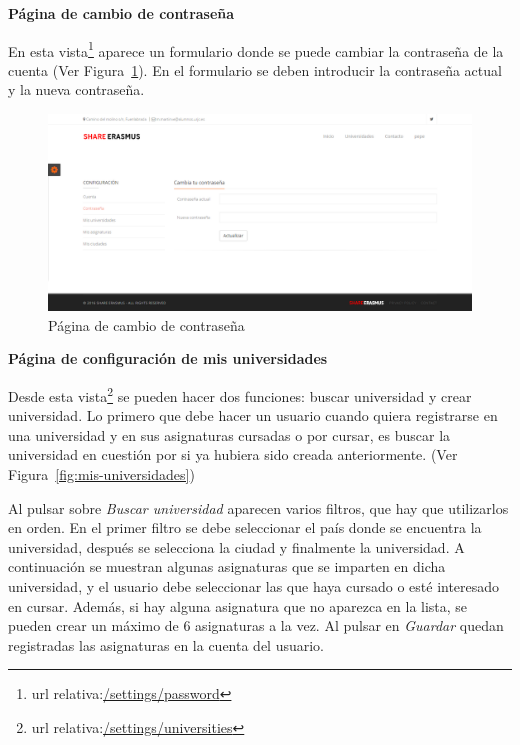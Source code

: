 \documentclass[a4paper, 12pt]{book}
\begin{document}
{\large  \textbf{Página de cambio de contraseña}\par}

En esta vista\footnote{url relativa:\url{/settings/password}} aparece un formulario donde se puede cambiar la contraseña de la cuenta (Ver Figura~\ref{fig:contrasena}). En el formulario se deben introducir la contraseña actual y la nueva contraseña.
\newline

\begin{figure}[H]
  \centering
  \includegraphics[width=16cm, keepaspectratio]{img/contrasena.png}
  \caption{Página de cambio de contraseña}
  \label{fig:contrasena}
\end{figure}

{\large  \textbf{Página de configuración de mis universidades}\par}

Desde esta vista\footnote{url relativa:\url{/settings/universities}} se pueden hacer dos funciones: buscar universidad y crear universidad. Lo primero que debe hacer un usuario cuando quiera registrarse en una universidad y en sus asignaturas cursadas o por cursar, es buscar la universidad en cuestión por si ya hubiera sido creada anteriormente.  (Ver Figura~\ref{fig:mis-universidades})
\newline

Al pulsar sobre \textit{Buscar universidad} aparecen varios filtros, que hay que utilizarlos en orden. En el primer filtro se debe seleccionar el país donde se encuentra la universidad, después se selecciona la ciudad y finalmente la universidad. A continuación se muestran algunas asignaturas que se imparten en dicha universidad, y el usuario debe seleccionar las que haya cursado o esté interesado en cursar. Además, si hay alguna asignatura que no aparezca en la lista, se pueden crear un máximo de 6 asignaturas a la vez. Al pulsar en \textit{Guardar} quedan registradas las asignaturas en la cuenta del usuario. 
\newline
\end{document}
